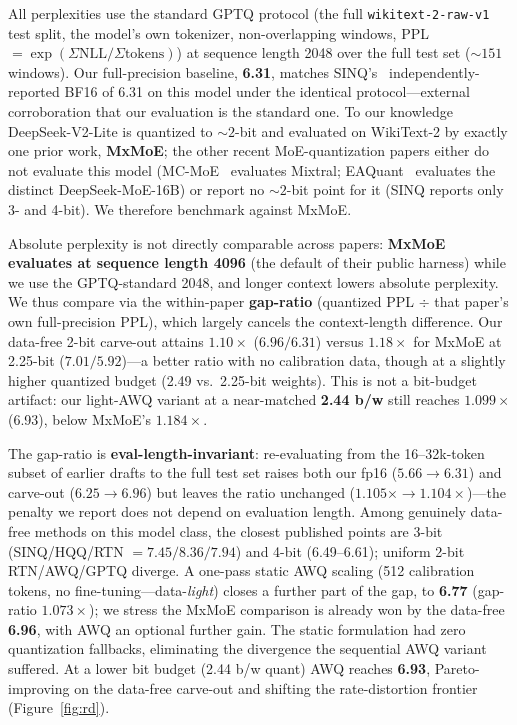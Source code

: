 \documentclass[10pt]{article}
\begin{document}
All perplexities use the standard GPTQ protocol (the full \texttt{wikitext-2-raw-v1} test split, the
model's own tokenizer, non-overlapping windows, PPL $=\exp(\Sigma\mathrm{NLL}/\Sigma\mathrm{tokens})$) at
sequence length 2048 over the full test set (${\sim}151$ windows). Our full-precision baseline,
\textbf{6.31}, matches SINQ's~\cite{sinq} independently-reported BF16 of 6.31 on this model under the
identical protocol---external corroboration that our evaluation is the standard one. To our knowledge
DeepSeek-V2-Lite is quantized to ${\sim}2$-bit and evaluated on WikiText-2 by exactly one prior work,
\textbf{MxMoE}; the other recent MoE-quantization papers either do not evaluate this model
(MC-MoE~\cite{mcmoe} evaluates Mixtral; EAQuant~\cite{eaquant} evaluates the distinct DeepSeek-MoE-16B) or
report no ${\sim}2$-bit point for it (SINQ reports only 3- and 4-bit). We therefore benchmark against MxMoE.

Absolute perplexity is not directly comparable across papers: \textbf{MxMoE evaluates at sequence length
4096} (the default of their public harness) while we use the GPTQ-standard 2048, and longer context
lowers absolute perplexity. We thus compare via the within-paper \textbf{gap-ratio} (quantized PPL $\div$
that paper's own full-precision PPL), which largely cancels the context-length difference. Our data-free
2-bit carve-out attains $\mathbf{1.10\times}$ ($6.96/6.31$) versus $\mathbf{1.18\times}$ for MxMoE at
2.25-bit ($7.01/5.92$)---a better ratio with no calibration data, though at a slightly higher quantized
budget (2.49 vs.\ 2.25-bit weights). This is not a bit-budget artifact: our light-AWQ variant at a
near-matched \textbf{2.44 b/w} still reaches $1.099\times$ (6.93), below MxMoE's $1.184\times$.

The gap-ratio is \textbf{eval-length-invariant}: re-evaluating from the 16--32k-token subset of earlier
drafts to the full test set raises both our fp16 ($5.66\to6.31$) and carve-out ($6.25\to6.96$) but leaves
the ratio unchanged ($1.105\times\to1.104\times$)---the penalty we report does not depend on evaluation
length. Among genuinely data-free methods on this model class, the closest published points are 3-bit
(SINQ/HQQ/RTN $=7.45/8.36/7.94$) and 4-bit (6.49--6.61); uniform 2-bit RTN/AWQ/GPTQ diverge. A one-pass
static AWQ scaling (512 calibration tokens, no fine-tuning---data-\emph{light}) closes a further part of
the gap, to \textbf{6.77} (gap-ratio $1.073\times$); we stress the MxMoE comparison is already won by the
data-free \textbf{6.96}, with AWQ an optional further gain. The static formulation had zero quantization
fallbacks, eliminating the divergence the sequential AWQ variant suffered. At a lower bit budget
(2.44 b/w quant) AWQ reaches \textbf{6.93}, Pareto-improving on the data-free carve-out and shifting the
rate-distortion frontier (Figure~\ref{fig:rd}).
\end{document}

